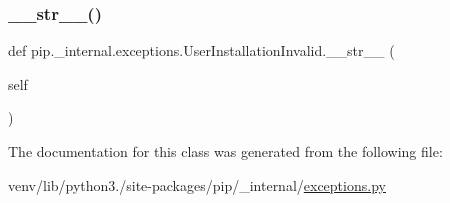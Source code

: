 \subsubsection{\texorpdfstring{\+\_\+\+\_\+str\+\_\+\+\_\+()}{\_\_str\_\_()}}
{\footnotesize\ttfamily def pip.\+\_\+internal.\+exceptions.\+User\+Installation\+Invalid.\+\_\+\+\_\+str\+\_\+\+\_\+ (\begin{DoxyParamCaption}\item[{}]{self }\end{DoxyParamCaption})}



The documentation for this class was generated from the following file\+:\begin{DoxyCompactItemize}
\item 
venv/lib/python3./site-\/packages/pip/\+\_\+internal/\hyperlink{pip_2__internal_2exceptions_8py}{exceptions.\+py}\end{DoxyCompactItemize}
